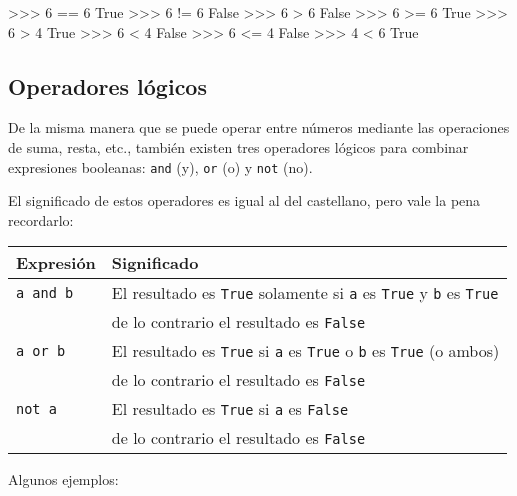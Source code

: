 \begin{codigo-python-sn}
>>> 6 == 6
True
>>> 6 != 6
False
>>> 6 > 6
False
>>> 6 >= 6
True
>>> 6 > 4
True
>>> 6 < 4
False
>>> 6 <= 4
False
>>> 4 < 6
True
\end{codigo-python-sn}

\subsection{Operadores lógicos}

De la misma manera que se puede operar entre números mediante las
operaciones de suma, resta, etc., también existen tres operadores lógicos
para combinar expresiones booleanas: \lstinline!and! (y), \lstinline!or!
(o) y \lstinline!not! (no).

El significado de estos operadores es igual al del castellano, pero vale la pena recordarlo:

\newcommand{\tablaOperadoresLogicos}{
\begin{center}
\begin{tabular}[c]{l l}
{\bf Expresión} & {\bf Significado}\\
\hline
\lstinline!a and b!& El resultado es \lstinline!True! solamente si
\lstinline!a! es \lstinline!True! y  \lstinline!b! es \lstinline!True! \\
& de lo contrario el resultado es \lstinline!False!\\
\lstinline!a or b!& El resultado es \lstinline!True! si \lstinline!a! es
\lstinline!True! o  \lstinline!b! es \lstinline!True! (o ambos) \\
& de lo contrario el resultado es \lstinline!False!\\
\lstinline!not a!& El resultado es \lstinline!True! si \lstinline!a! es
\lstinline!False!\\
& de lo contrario el resultado es \lstinline!False!\\
\end{tabular}
\end{center}
}
\tablaOperadoresLogicos

Algunos ejemplos:

